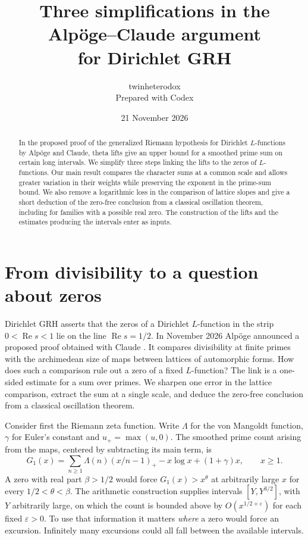 \documentclass[11pt,letterpaper]{article}
\title{Three simplifications in the Alpöge--Claude argument\\for Dirichlet GRH}
\author{twinheterodox\\{\small Prepared with Codex}}
\date{21 November 2026}
\newcommand{\eps}{\varepsilon}
\newcommand{\Rea}{\operatorname{Re}}
\numberwithin{equation}{section}
\begin{document}
\maketitle

\begin{abstract}
In the proposed proof of the generalized Riemann hypothesis for Dirichlet \(L\)-functions by Alpöge and Claude, theta lifts give an upper bound for a smoothed prime sum on certain long intervals. We simplify three steps linking the lifts to the zeros of \(L\)-functions. Our main result compares the character sums at a common scale and allows greater variation in their weights while preserving the exponent in the prime-sum bound. We also remove a logarithmic loss in the comparison of lattice slopes and give a short deduction of the zero-free conclusion from a classical oscillation theorem, including for families with a possible real zero. The construction of the lifts and the estimates producing the intervals enter as inputs.
\end{abstract}
\setlength{\abovedisplayskip}{8pt plus 2pt minus 2pt}
\setlength{\belowdisplayskip}{8pt plus 2pt minus 2pt}

\section{From divisibility to a question about zeros}\label{sec:intro}

Dirichlet GRH asserts that the zeros of a Dirichlet \(L\)-function in the strip \(0<\Rea s<1\) lie on the line \(\Rea s=1/2\). In November 2026 Alpöge announced a proposed proof obtained with Claude \cite{alpoge}. It compares divisibility at finite primes with the archimedean size of maps between lattices of automorphic forms. How does such a comparison rule out a zero of a fixed \(L\)-function? The link is a one-sided estimate for a sum over primes. We sharpen one error in the lattice comparison, extract the sum at a single scale, and deduce the zero-free conclusion from a classical oscillation theorem.

Consider first the Riemann zeta function. Write \(\Lambda\) for the von Mangoldt function, \(\gamma\) for Euler's constant and \(u_+=\max(u,0)\). The smoothed prime count arising from the maps, centered by subtracting its main term, is
\begin{equation}\label{eq:zeta-first}
 G_1(x)=\sum_{n\ge1}\Lambda(n)(x/n-1)_+-x\log x+(1+\gamma)x,\qquad x\ge1 .
\end{equation}
A zero with real part \(\beta>1/2\) would force \(G_1(x)>x^\theta\) at arbitrarily large \(x\) for every \(1/2<\theta<\beta\). The arithmetic construction supplies intervals \([Y,Y^{3/2}]\), with \(Y\) arbitrarily large, on which the count is bounded above by \(O(x^{1/2+\eps})\) for each fixed \(\eps>0\). To use that information it matters \emph{where} a zero would force an excursion. Infinitely many excursions could all fall between the available intervals.
\end{document}
